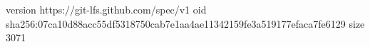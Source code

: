 version https://git-lfs.github.com/spec/v1
oid sha256:07ca10d88acc55df5318750cab7e1aa4ae11342159fe3a519177efaca7fe6129
size 3071
